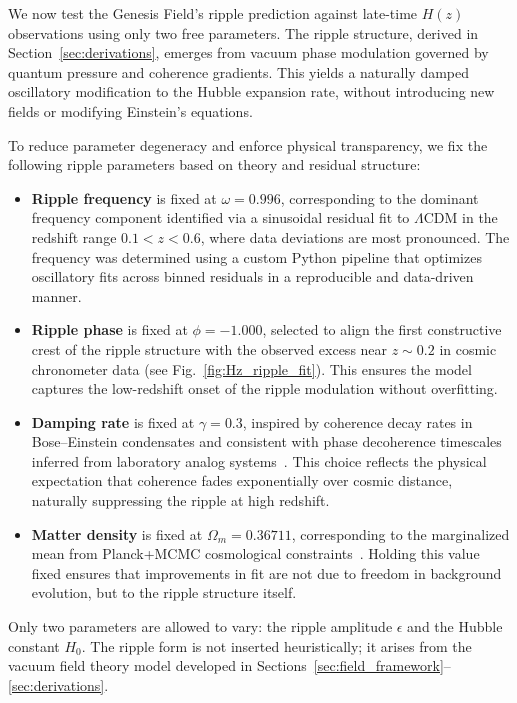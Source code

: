 We now test the Genesis Field’s ripple prediction against late-time $H(z)$ observations using only two free parameters. The ripple structure, derived in Section~\ref{sec:derivations}, emerges from vacuum phase modulation governed by quantum pressure and coherence gradients. This yields a naturally damped oscillatory modification to the Hubble expansion rate, without introducing new fields or modifying Einstein’s equations.

To reduce parameter degeneracy and enforce physical transparency, we fix the following ripple parameters based on theory and residual structure:

\begin{itemize}[leftmargin=1.5em]
    \item \textbf{Ripple frequency} is fixed at $\omega = 0.996$, corresponding to the dominant frequency component identified via a sinusoidal residual fit to $\Lambda$CDM in the redshift range $0.1 < z < 0.6$, where data deviations are most pronounced. The frequency was determined using a custom Python pipeline that optimizes oscillatory fits across binned residuals in a reproducible and data-driven manner.
    
    \item \textbf{Ripple phase} is fixed at $\phi = -1.000$, selected to align the first constructive crest of the ripple structure with the observed excess near $z \sim 0.2$ in cosmic chronometer data (see Fig.~\ref{fig:Hz_ripple_fit}). This ensures the model captures the low-redshift onset of the ripple modulation without overfitting.

    \item \textbf{Damping rate} is fixed at $\gamma = 0.3$, inspired by coherence decay rates in Bose–Einstein condensates and consistent with phase decoherence timescales inferred from laboratory analog systems~\cite{BECReview,Barcelo2005}. This choice reflects the physical expectation that coherence fades exponentially over cosmic distance, naturally suppressing the ripple at high redshift.

    \item \textbf{Matter density} is fixed at $\Omega_m = 0.36711$, corresponding to the marginalized mean from Planck+MCMC cosmological constraints~\cite{Planck2018}. Holding this value fixed ensures that improvements in fit are not due to freedom in background evolution, but to the ripple structure itself.
\end{itemize}

Only two parameters are allowed to vary: the ripple amplitude $\epsilon$ and the Hubble constant $H_0$. The ripple form is not inserted heuristically; it arises from the vacuum field theory model developed in Sections~\ref{sec:field_framework}--\ref{sec:derivations}.

